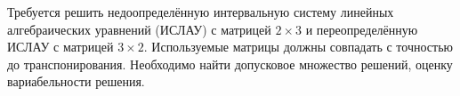 Требуется решить недоопределённую интервальную систему линейных алгебраических уравнений (ИСЛАУ) с матрицей $2 \times 3$ и переопределённую ИСЛАУ с матрицей $3 \times 2$. Используемые матрицы должны совпадать с точностью до транспонирования. Необходимо найти допусковое множество решений, оценку вариабельности решения.